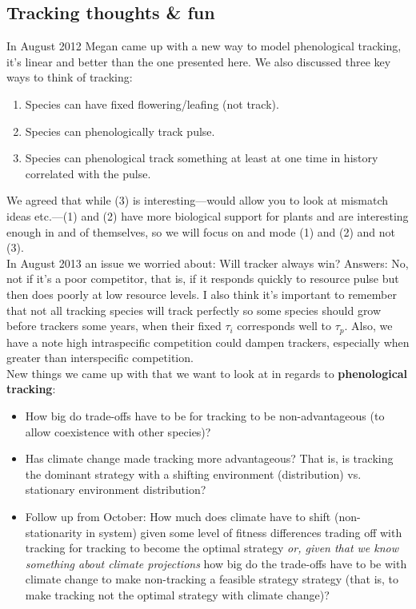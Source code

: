 \documentclass[11pt,a4paper,oneside]{article}
\begin{document}
\subsection{Tracking thoughts \& fun}
In August 2012 Megan came up with a new way to model phenological tracking, it's linear and better than the one presented here. We also discussed three key ways to think of tracking:
\begin{enumerate}
\item Species can have fixed flowering/leafing (not track).
\item Species can phenologically track pulse.
\item Species can phenological track something at least at one time in history correlated with the pulse.
\end{enumerate}
We agreed that while (3) is interesting---would allow you to look at mismatch ideas etc.---(1) and (2) have more biological support for plants and are interesting enough in and of themselves, so we will focus on and mode (1) and (2) and not (3).\\

\noindent In August 2013 an issue we worried about: Will tracker always win? Answers: No, not if it's a poor competitor, that is, if it responds quickly to resource pulse but then does poorly at low resource levels. I also think it's important to remember that not all tracking species will track perfectly so some species should grow before trackers some years, when their fixed \(\tau_{i}\) corresponds well to \(\tau_{p}\). Also, we have a note high intraspecific competition could dampen trackers, especially when greater than interspecific competition.\\

\noindent New things we came up with that we want to look at in regards to {\bf phenological tracking}:
\begin{itemize}
\item How big do trade-offs have to be for tracking to be non-advantageous (to allow coexistence with other species)?
\item Has climate change made tracking more advantageous? That is, is tracking the dominant strategy with a shifting environment (distribution) vs. stationary environment distribution?
\item Follow up from October: How much does climate have to shift (non-stationarity in system) given some level of fitness differences trading off with tracking for tracking to become the optimal strategy \emph{or, given that we know something about climate projections} how big do the trade-offs have to be with climate change to make non-tracking a feasible strategy strategy (that is, to make tracking not the optimal strategy with climate change)?
\end{itemize}
\end{document}
